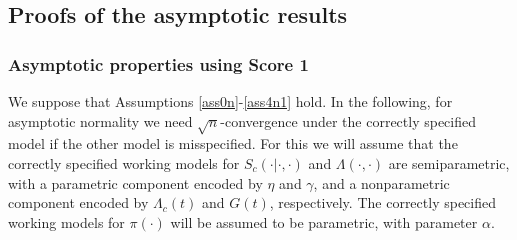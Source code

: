 \documentclass[11pt]{article}
\begin{document}
\newpage
\subsection{Proofs of the asymptotic results}\label{mainproof}

\subsubsection{Asymptotic properties using Score 1}

We suppose that Assumptions \ref{ass0n}-\ref{ass4n1} hold.
In the following,  
for asymptotic normality we need $\sqrt{n}$-convergence under the correctly specified model if the other model is misspecified. %
For this we will assume that the correctly specified  working models for $S_c(\cdot | \cdot,\cdot)$ and $\Lambda(\cdot,\cdot)$ are semiparametric, with a parametric component encoded by $\eta$ and $\gamma$, and a nonparametric component encoded by $\Lambda_{c}(t)$ and $G(t)$, respectively. %
The correctly specified  working models for $\pi(\cdot)$ will be assumed to be parametric, with parameter $\alpha$. 
\end{document}
